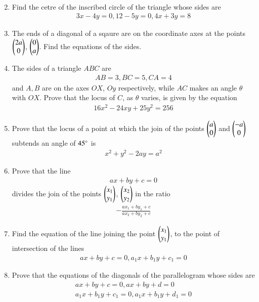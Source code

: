 \begin{enumerate}[label=\arabic*.,ref=\thesubsection.\theenumi]
\begin{align*}
\end{align*}
\item Find the cetre of the inscribed circle of the triangle whose sides are
\begin{align*}
3x-4y=0, 12-5y=0, 4x+3y=8
\end{align*}
\item The ends of a diagonal of a sqaure are on the coordinate axes at the points $\begin{pmatrix}2a\\0\end{pmatrix}$, $\begin{pmatrix}0\\a\end{pmatrix}$.  Find the equations of the sides.
\item The sides of a triangle $ABC$ are
\begin{align*}
AB=3, BC = 5, CA = 4
\end{align*}
and $A, B$ are on the axes $OX$, $Oy$ respectively, while $AC$ makes an angle $\theta$ with $OX$.  Prove that the locus of $C$, as $\theta$ varies, is given by the equation
\begin{align*}
16x^2-24xy+25y^2 = 256
\end{align*}
\item Prove that the locus of a point at which the join of the points $\begin{pmatrix}a\\0\end{pmatrix}$ and $\begin{pmatrix}-a\\0\end{pmatrix}$ subtends an angle of $45\degree$ is
\begin{align*}
x^2+y^2-2ay = a^2
\end{align*}
\item Prove that the line
\begin{align*}
ax+by+c=0
\end{align*}
divides the join of the points $\begin{pmatrix}x_1\\y_1\end{pmatrix}$, $\begin{pmatrix}x_2\\y_2\end{pmatrix}$ in the ratio
\begin{align*}
-\frac{ax_1+by_1+c}{ax_2+by_2+c}
\end{align*}
\item Find the equation of the line joining the point $\begin{pmatrix}x_1\\y_1\end{pmatrix}$, to the point of intersection of the lines
\begin{align*}
ax+by+c = 0, a_1x+b_1y+c_1 = 0
\end{align*}
\item Prove that the equations of the diagonals of the parallelogram whose sides are
\begin{align*}
ax+by+c = 0, ax+by+d = 0
\\
a_1x+b_1y+c_1 = 0, a_1x+b_1y+d_1 = 0
\end{align*}

\end{enumerate}
